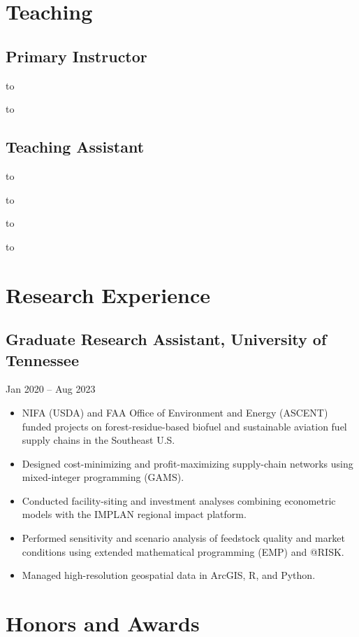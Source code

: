 \documentclass[11pt]{article}
\newcommand{\entry}[2]{%
  \par\noindent\hbox to \linewidth{\strut #1\hfill #2}\par
}
\begin{document}
\section*{Teaching}

\subsection*{Primary Instructor}
\entry{ECON 351 -- Monetary Economics}{Spring 2025, 2026}
\entry{ECON 322 -- The Global Economy: Trade and Development}{Summer 2025}

\subsection*{Teaching Assistant}
\entry{ECON 511 -- Microeconomic Theory}{Fall 2023--2025}
\entry{ECON 581 -- Mathematical Methods in Economics}{Summer 2024}
\entry{ECON 512 -- Advanced Microeconomics}{Spring 2024}
\entry{AREC 525 -- Agribusiness Operations Research Methods}{Spring 2022--2023}

\section*{Research Experience}

\subsection*{Graduate Research Assistant, University of Tennessee}
\hfill Jan 2020 -- Aug 2023
\begin{itemize}
  \item NIFA (USDA) and FAA Office of Environment and Energy (ASCENT) funded projects on forest-residue-based biofuel and sustainable aviation fuel supply chains in the Southeast U.S.
  \item Designed cost-minimizing and profit-maximizing supply-chain networks using mixed-integer programming (GAMS).
  \item Conducted facility-siting and investment analyses combining econometric models with the IMPLAN regional impact platform.
  \item Performed sensitivity and scenario analysis of feedstock quality and market conditions using extended mathematical programming (EMP) and @RISK.
  \item Managed high-resolution geospatial data in ArcGIS, R, and Python.
\end{itemize}

\section*{Honors and Awards}
\end{document}
